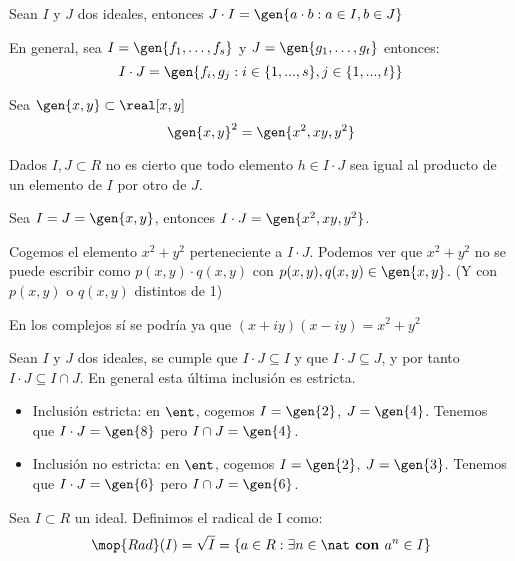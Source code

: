 \begin{defn} \label{def:IdealProducto}
	Sean $I$ y $J$ dos ideales, entonces $J\cdot I = \gen{a\cdot b: a \in I, b \in J}$

	En general, sea $I=\gen{f_1,\dotsc ,f_s}$ y $J=\gen{g_1,\dotsc,g_t}$ entonces:
	$$I\cdot J=\gen{ f_i, g_j: i \in \{1,...,s\}, j \in \{1,...,t\}}$$
\end{defn}

\begin{example} Sea $\gen{x,y} \subset \real[x,y]$
	$$\gen{x,y}^2 = \gen{x^2,xy,y^2}$$
\end{example}

\obs Dados $I,J \subset R$ no es cierto que todo elemento $h \in I\cdot J$ sea igual al producto de un elemento de $I$ por otro de $J$.

\begin{example}
	Sea $I=J=\gen{x,y}$, entonces $I\cdot J = \gen{x^2,xy,y^2}$.

	Cogemos el elemento $x^2 + y^2$ perteneciente a $I\cdot J$. Podemos ver que $x^2 + y^2$ no se puede escribir como $p(x,y) \cdot q(x,y)$ con $p(x,y),q(x,y) \in \gen{x,y}$. (Y con $p(x,y)$ o $q(x,y)$ distintos de 1)

	\obs En los complejos sí se podría ya que $(x+iy)(x-iy)=x^2 + y^2$
\end{example}

\obs Sean $I$ y $J$ dos ideales, se cumple que $I\cdot J \subseteq I$ y que $I \cdot J \subseteq J$, y por tanto $I \cdot J \subseteq I \cap J$. En general esta última inclusión es estricta.

\begin{example}
	\begin{itemize}
\item Inclusión estricta: en $\ent$, cogemos $I=\gen{2}$, $J=\gen{4}$. Tenemos que $I\cdot J=\gen{8}$ pero $I\cap J=\gen{4}$.
\item Inclusión no estricta: en $\ent$, cogemos $I=\gen{2}$, $J=\gen{3}$. Tenemos que $I\cdot J=\gen{6}$ pero $I\cap J=\gen{6}$.
	\end{itemize}
\end{example}

\begin{defn} \label{def:RadicalIdeal}
Sea $I \subset R$ un ideal. Definimos el radical de I como:
$$\mop{Rad}(I)=\sqrt{I}=\{a \in R: \exists n \in \nat \textbf{ con } a^n \in I \}$$
\end{defn}

